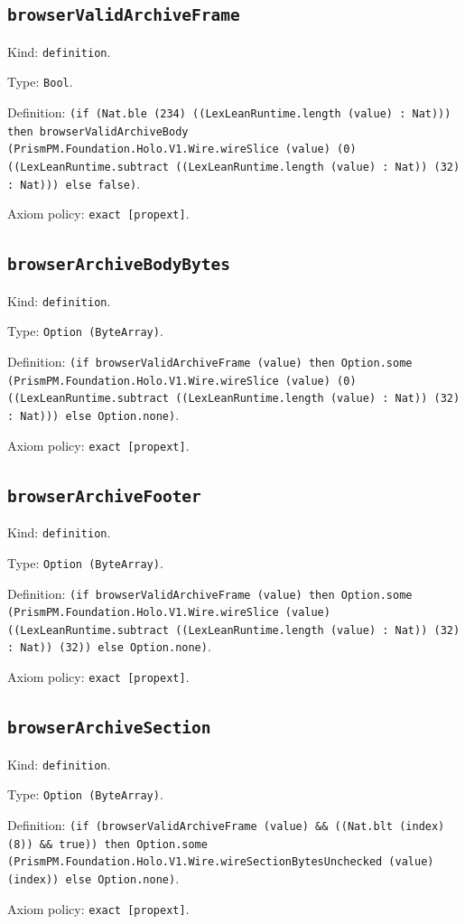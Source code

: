 \documentclass[11pt]{article}
\begin{document}
\subsection*{\texttt{browserValidArchiveFrame}}
\noindent Kind: \texttt{definition}.\par
\noindent Type: \texttt{Bool}.\par
\noindent Definition: \texttt{(if (Nat.ble (234) ((LexLeanRuntime.length (value) : Nat))) then browserValidArchiveBody (PrismPM.Foundation.Holo.V1.Wire.wireSlice (value) (0) ((LexLeanRuntime.subtract ((LexLeanRuntime.length (value) : Nat)) (32) : Nat))) else false)}.\par
\noindent Axiom policy: \texttt{exact [propext]}.\par
\subsection*{\texttt{browserArchiveBodyBytes}}
\noindent Kind: \texttt{definition}.\par
\noindent Type: \texttt{Option (ByteArray)}.\par
\noindent Definition: \texttt{(if browserValidArchiveFrame (value) then Option.some (PrismPM.Foundation.Holo.V1.Wire.wireSlice (value) (0) ((LexLeanRuntime.subtract ((LexLeanRuntime.length (value) : Nat)) (32) : Nat))) else Option.none)}.\par
\noindent Axiom policy: \texttt{exact [propext]}.\par
\subsection*{\texttt{browserArchiveFooter}}
\noindent Kind: \texttt{definition}.\par
\noindent Type: \texttt{Option (ByteArray)}.\par
\noindent Definition: \texttt{(if browserValidArchiveFrame (value) then Option.some (PrismPM.Foundation.Holo.V1.Wire.wireSlice (value) ((LexLeanRuntime.subtract ((LexLeanRuntime.length (value) : Nat)) (32) : Nat)) (32)) else Option.none)}.\par
\noindent Axiom policy: \texttt{exact [propext]}.\par
\subsection*{\texttt{browserArchiveSection}}
\noindent Kind: \texttt{definition}.\par
\noindent Type: \texttt{Option (ByteArray)}.\par
\noindent Definition: \texttt{(if (browserValidArchiveFrame (value) \&\& ((Nat.blt (index) (8)) \&\& true)) then Option.some (PrismPM.Foundation.Holo.V1.Wire.wireSectionBytesUnchecked (value) (index)) else Option.none)}.\par
\noindent Axiom policy: \texttt{exact [propext]}.\par
\end{document}
